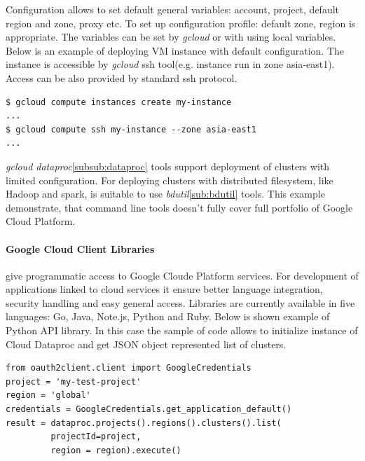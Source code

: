 \documentclass[a4paper,12pt,oneside]{report}
\begin{document}
Configuration allows to set default general variables: account, project, default region 
and zone, proxy etc. To set up configuration profile: default zone, region is appropriate. 
The variables can be set by \textit{gcloud} or with using 
local variables.
Below is an example of deploying VM instance with default configuration. The instance 
is accessible by \textit{gcloud} ssh tool(e.g. instance run in zone asia-east1). Access can be also provided 
by standard ssh protocol.

\begin{footnotesize}
\begin{lstlisting}[style=mybash]
$ gcloud compute instances create my-instance
...
$ gcloud compute ssh my-instance --zone asia-east1
...
\end{lstlisting}\end{footnotesize}
 

\textit{gcloud dataproc}\ref{subsub:dataproc} tools support deployment of clusters with limited configuration. For deploying 
clusters with distributed filesystem, like Hadoop and spark, is suitable to use \textit{bdutil}\ref{sub:bdutil} tools. 
This example demonstrate, that command line tools doesn’t fully cover full portfolio of Google Cloud Platform. 
   
\paragraph{Google Cloud Client Libraries} give programmatic access to Google Cloude Platform services. For development of applications 
linked to cloud services it ensure better language integration, security handling and easy general access. Libraries are currently 
available in five languages: Go, Java, Note.js, Python and Ruby. Below is shown 
example of Python API library. In this case the sample of code allows to initialize  
instance of Cloud Dataproc and get JSON object represented list of clusters.

\begin{footnotesize}
\begin{lstlisting}[style=python]
from oauth2client.client import GoogleCredentials
project = 'my-test-project'
region = 'global'
credentials = GoogleCredentials.get_application_default()
result = dataproc.projects().regions().clusters().list(
         projectId=project,
         region = region).execute()
\end{lstlisting}\end{footnotesize}
 
\end{document}
